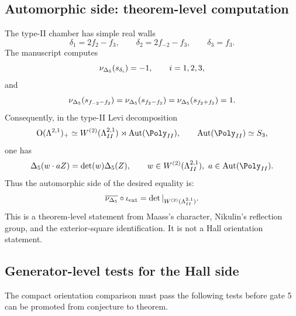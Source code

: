 \subsection{Automorphic side: theorem-level computation}

The type-II chamber has simple real walls
\[
        \delta_1=2f_2-f_3,\qquad
        \delta_2=2f_{-2}-f_3,\qquad
        \delta_3=f_3 .
\]
The manuscript computes
\[
        \nu_{\Delta_5}(s_{\delta_i})=-1,\qquad i=1,2,3,
\]
and
\[
        \nu_{\Delta_5}(s_{f_{-2}-f_2})
        =
        \nu_{\Delta_5}(s_{f_2-f_3})
        =
        \nu_{\Delta_5}(s_{f_2+f_3})=1 .
\]
Consequently, in the type-II Levi decomposition
\[
        \Orth(\La^{2,1})_+
        \simeq
        \WII\rtimes\Aut(\Poly_{II}),
        \qquad \Aut(\Poly_{II})\simeq S_3,
\]
one has
\[
        \Delta_5(w\cdot a Z)=\det(w)\Delta_5(Z),
        \qquad
        w\in \WII,\ a\in\Aut(\Poly_{II}).
\]
Thus the automorphic side of the desired equality is:
\[
        \overline{\nu_{\Delta_5}}\circ\iota_{\mathrm{ext}}
        =
        \det|_{W^{(2)}(\Lambda^{2,1}_{II})}.
\]
This is a theorem-level statement from Maass's character, Nikulin's
reflection group, and the exterior-square identification.  It is not a
Hall orientation statement.

\subsection{Generator-level tests for the Hall side}

The compact orientation comparison must pass the following tests before
gate 5 can be promoted from conjecture to theorem.

